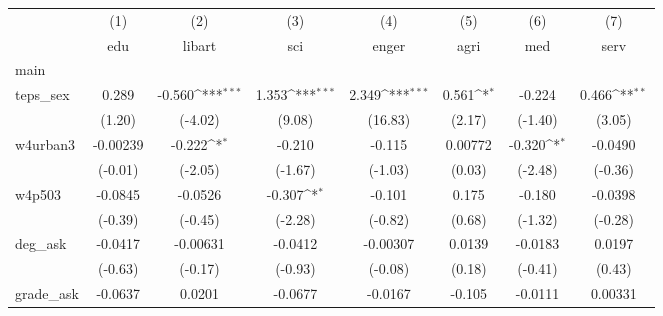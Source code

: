 {
\def\sym#1{\ifmmode^{#1}\else\(^{#1}\)\fi}
\begin{tabular}{l*{7}{c}}
\hline\hline
            &\multicolumn{1}{c}{(1)}&\multicolumn{1}{c}{(2)}&\multicolumn{1}{c}{(3)}&\multicolumn{1}{c}{(4)}&\multicolumn{1}{c}{(5)}&\multicolumn{1}{c}{(6)}&\multicolumn{1}{c}{(7)}\\
            &\multicolumn{1}{c}{edu}&\multicolumn{1}{c}{libart}&\multicolumn{1}{c}{sci}&\multicolumn{1}{c}{enger}&\multicolumn{1}{c}{agri}&\multicolumn{1}{c}{med}&\multicolumn{1}{c}{serv}\\
\hline
main        &                     &                     &                     &                     &                     &                     &                     \\
teps\_sex    &       0.289         &      -0.560\sym{***}&       1.353\sym{***}&       2.349\sym{***}&       0.561\sym{*}  &      -0.224         &       0.466\sym{**} \\
            &      (1.20)         &     (-4.02)         &      (9.08)         &     (16.83)         &      (2.17)         &     (-1.40)         &      (3.05)         \\
[1em]
w4urban3    &    -0.00239         &      -0.222\sym{*}  &      -0.210         &      -0.115         &     0.00772         &      -0.320\sym{*}  &     -0.0490         \\
            &     (-0.01)         &     (-2.05)         &     (-1.67)         &     (-1.03)         &      (0.03)         &     (-2.48)         &     (-0.36)         \\
[1em]
w4p503      &     -0.0845         &     -0.0526         &      -0.307\sym{*}  &      -0.101         &       0.175         &      -0.180         &     -0.0398         \\
            &     (-0.39)         &     (-0.45)         &     (-2.28)         &     (-0.82)         &      (0.68)         &     (-1.32)         &     (-0.28)         \\
[1em]
deg\_ask     &     -0.0417         &    -0.00631         &     -0.0412         &    -0.00307         &      0.0139         &     -0.0183         &      0.0197         \\
            &     (-0.63)         &     (-0.17)         &     (-0.93)         &     (-0.08)         &      (0.18)         &     (-0.41)         &      (0.43)         \\
[1em]
grade\_ask   &     -0.0637         &      0.0201         &     -0.0677         &     -0.0167         &      -0.105         &     -0.0111         &     0.00331         \\

\end{tabular}}
